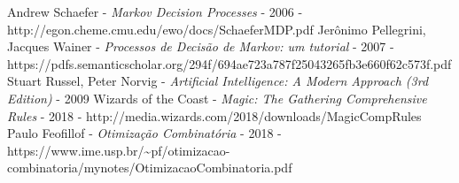 \documentclass[dvipsnames]{book}
\begin{document}






\newpage




\begin{thebibliography}{1}
  Andrew Schaefer - {\em Markov Decision Processes} - 2006 - http://egon.cheme.cmu.edu/ewo/docs/SchaeferMDP.pdf
  Jerônimo Pellegrini, Jacques Wainer - {\em Processos de Decisão de Markov: um tutorial} - 2007 - https://pdfs.semanticscholar.org/294f/694ae723a787f25043265fb3e660f62c573f.pdf
  Stuart Russel, Peter Norvig - {\em Artificial Intelligence: A Modern Approach (3rd Edition)} - 2009
  Wizards of the Coast - {\em Magic: The Gathering Comprehensive Rules} - 2018 - http://media.wizards.com/2018/downloads/MagicCompRules%
  Paulo Feofillof - {\em Otimização Combinatória } - 2018 - https://www.ime.usp.br/{\textasciitilde}pf/otimizacao-combinatoria/mynotes/OtimizacaoCombinatoria.pdf
\end{thebibliography}
\end{document}
